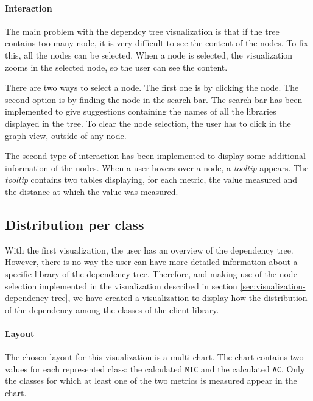 \paragraph{Interaction}
The main problem with the dependcy tree visualization is that if the tree contains too many node, it is very difficult to see the content of the nodes. To fix this, all the nodes can be selected. When a node is selected, the visualization zooms in the selected node, so the user can see the content.

There are two ways to select a node. The first one is by clicking the node. The second option is by finding the node in the search bar. The search bar has been implemented to give suggestions containing the names of all the libraries displayed in the tree. To clear the node selection, the user has to click in the graph view, outside of any node.

The second type of interaction has been implemented to display some additional information of the nodes. When a user hovers over a node, a \textit{tooltip} appears. The \textit{tooltip} contains two tables displaying, for each metric, the value measured and the distance at which the value was measured.

\subsection{Distribution per class}
With the first visualization, the user has an overview of the dependency tree. However, there is no way the user can have more detailed information about a specific library of the dependency tree. Therefore, and making use of the node selection implemented in the visualization described in section \ref{sec:visualization-dependency-tree}, we have created a visualization to display how the distribution of the dependency among the classes of the client library.

\paragraph{Layout}
The chosen layout for this visualization is a multi-chart. The chart contains two values for each represented class: the calculated \texttt{MIC} and the calculated \texttt{AC}. Only the classes for which at least one of the two metrics is measured appear in the chart. 

